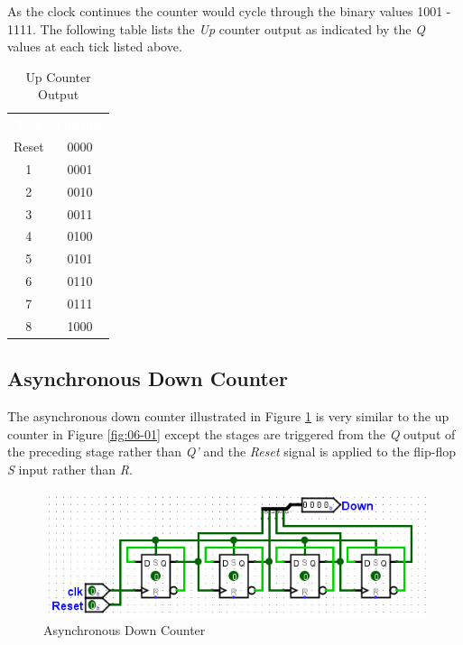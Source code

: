 As the clock continues the counter would cycle through the binary values 1001 - 1111. The following table lists the \textit{Up} counter output as indicated by the \textit{Q} values at each tick listed above.

\begin{table}[H]
	\sffamily
	\newcommand{\head}[1]{\textcolor{white}{\textbf{#1}}}		
	\begin{center}
		\begin{tabular}{cc} 
			\rowcolor{black!75}
			\head{Tick} & \head{Output} \\
			Reset & 0000 \\
			1 & 0001 \\
			2 & 0010 \\
			3 & 0011 \\
			4 & 0100 \\
			5 & 0101 \\
			6 & 0110 \\
			7 & 0111 \\
			8 & 1000
		\end{tabular}
	\end{center}
	\caption{Up Counter Output}
	\label{tab0601}
\end{table}

\subsection{Asynchronous Down Counter}

The asynchronous down counter illustrated in Figure \ref{fig:06-02} is very similar to the up counter in Figure \ref{fig:06-01} except the stages are triggered from the \textit{Q} output of the preceding stage rather than \textit{Q'} and the \textit{Reset} signal is applied to the flip-flop \textit{S} input rather than \textit{R}.

\begin{figure}[H]
	\centering
	\includegraphics[width=\maxwidth{.95\linewidth}]{gfx/06-02}
	\caption{Asynchronous Down Counter}
	\label{fig:06-02}
\end{figure}

